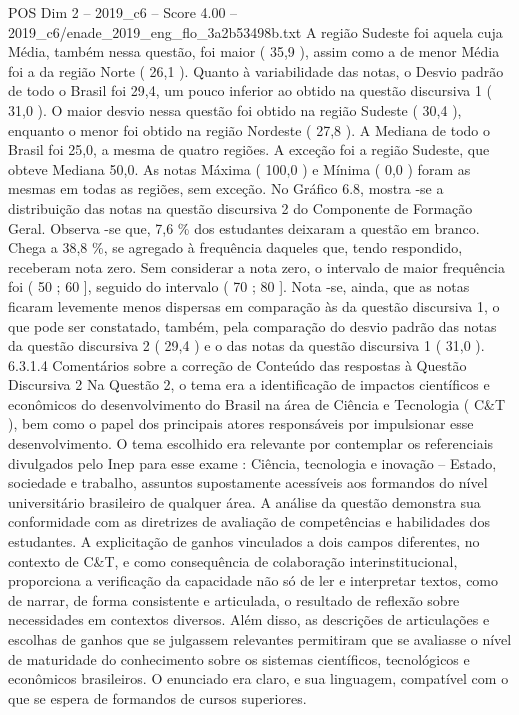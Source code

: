 \begin{textsample}{POS Dim 2 – 2019\_c6 – Score 4.00 – 2019\_c6/enade\_2019\_eng\_flo\_3a2b53498b.txt}
A região Sudeste foi aquela cuja Média, também nessa questão, foi maior ( 35,9 ), assim como a de menor Média foi a da região Norte ( 26,1 ).
Quanto à variabilidade das notas, o Desvio padrão de todo o Brasil foi 29,4, um pouco inferior ao obtido na questão discursiva 1 ( 31,0 ).
O maior desvio nessa questão foi obtido na região Sudeste ( 30,4 ), enquanto o menor foi obtido na região Nordeste ( 27,8 ).
A Mediana de todo o Brasil foi 25,0, a mesma de quatro regiões.
A exceção foi a região Sudeste, que obteve Mediana 50,0.
As notas Máxima ( 100,0 ) e Mínima ( 0,0 ) foram as mesmas em todas as regiões, sem exceção.
No Gráfico 6.8, mostra -se a distribuição das notas na questão discursiva 2 do Componente de Formação Geral.
Observa -se que, 7,6 \% dos estudantes deixaram a questão em branco.
Chega a 38,8 \%, se agregado à frequência daqueles que, tendo respondido, receberam nota zero.
Sem considerar a nota zero, o intervalo de maior frequência foi ( 50 ; 60 ], seguido do intervalo ( 70 ; 80 ].
Nota -se, ainda, que as notas ficaram levemente menos dispersas em comparação às da questão discursiva 1, o que pode ser constatado, também, pela comparação do desvio padrão das notas da questão discursiva 2 ( 29,4 ) e o das notas da questão discursiva 1 ( 31,0 ). 6.3.1.4 Comentários sobre a correção de Conteúdo das respostas à Questão Discursiva 2 Na Questão 2, o tema era a identificação de impactos científicos e econômicos do desenvolvimento do Brasil na área de Ciência e Tecnologia ( C\&T ), bem como o papel dos principais atores responsáveis por impulsionar esse desenvolvimento.
O tema escolhido era relevante por contemplar os referenciais divulgados pelo Inep para esse exame : Ciência, tecnologia e inovação – Estado, sociedade e trabalho, assuntos supostamente acessíveis aos formandos do nível universitário brasileiro de qualquer área.
A análise da questão demonstra sua conformidade com as diretrizes de avaliação de competências e habilidades dos estudantes.
A explicitação de ganhos vinculados a dois campos diferentes, no contexto de C\&T, e como consequência de colaboração interinstitucional, proporciona a verificação da capacidade não só de ler e interpretar textos, como de narrar, de forma consistente e articulada, o resultado de reflexão sobre necessidades em contextos diversos.
Além disso, as descrições de articulações e escolhas de ganhos que se julgassem relevantes permitiram que se avaliasse o nível de maturidade do conhecimento sobre os sistemas científicos, tecnológicos e econômicos brasileiros.
O enunciado era claro, e sua linguagem, compatível com o que se espera de formandos de cursos superiores.

\end{textsample}
